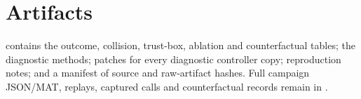 \documentclass[11pt]{article}
\begin{document}
\section{Artifacts}
 contains the outcome, collision,
trust-box, ablation and counterfactual tables; the diagnostic methods; patches
for every diagnostic controller copy; reproduction notes; and a manifest of
source and raw-artifact hashes. Full campaign JSON/MAT, replays, captured calls
and counterfactual records remain in
.
\end{document}
